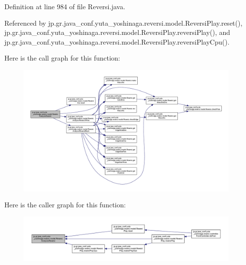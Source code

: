 Definition at line 984 of file Reversi.\+java.



Referenced by jp.\+gr.\+java\+\_\+conf.\+yuta\+\_\+yoshinaga.\+reversi.\+model.\+Reversi\+Play.\+reset(), jp.\+gr.\+java\+\_\+conf.\+yuta\+\_\+yoshinaga.\+reversi.\+model.\+Reversi\+Play.\+reversi\+Play(), and jp.\+gr.\+java\+\_\+conf.\+yuta\+\_\+yoshinaga.\+reversi.\+model.\+Reversi\+Play.\+reversi\+Play\+Cpu().

Here is the call graph for this function\+:\nopagebreak
\begin{figure}[H]
\begin{center}
\leavevmode
\includegraphics[width=350pt]{classjp_1_1gr_1_1java__conf_1_1yuta__yoshinaga_1_1reversi_1_1model_1_1_reversi_a43098c043d0424bb5e5e60db358a324d_cgraph}
\end{center}
\end{figure}
Here is the caller graph for this function\+:\nopagebreak
\begin{figure}[H]
\begin{center}
\leavevmode
\includegraphics[width=350pt]{classjp_1_1gr_1_1java__conf_1_1yuta__yoshinaga_1_1reversi_1_1model_1_1_reversi_a43098c043d0424bb5e5e60db358a324d_icgraph}
\end{center}
\end{figure}
\mbox{\label{classjp_1_1gr_1_1java__conf_1_1yuta__yoshinaga_1_1reversi_1_1model_1_1_reversi_adb74246f49150e02201766a1fa6cf732}} 
